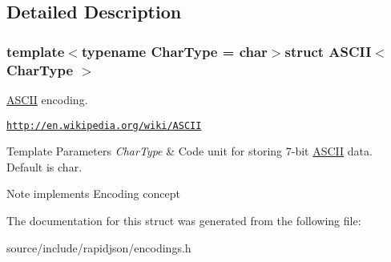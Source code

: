 \subsection{Detailed Description}
\subsubsection*{template$<$typename Char\+Type = char$>$struct A\+S\+C\+I\+I$<$ Char\+Type $>$}

\hyperlink{struct_a_s_c_i_i}{A\+S\+C\+I\+I} encoding. 

\href{http://en.wikipedia.org/wiki/ASCII}{\tt http\+://en.\+wikipedia.\+org/wiki/\+A\+S\+C\+I\+I} 
\begin{DoxyTemplParams}{Template Parameters}
{\em Char\+Type} & Code unit for storing 7-\/bit \hyperlink{struct_a_s_c_i_i}{A\+S\+C\+I\+I} data. Default is char. \\
\hline
\end{DoxyTemplParams}
\begin{DoxyNote}{Note}
implements Encoding concept 
\end{DoxyNote}


The documentation for this struct was generated from the following file\+:\begin{DoxyCompactItemize}
\item 
source/include/rapidjson/encodings.\+h\end{DoxyCompactItemize}
